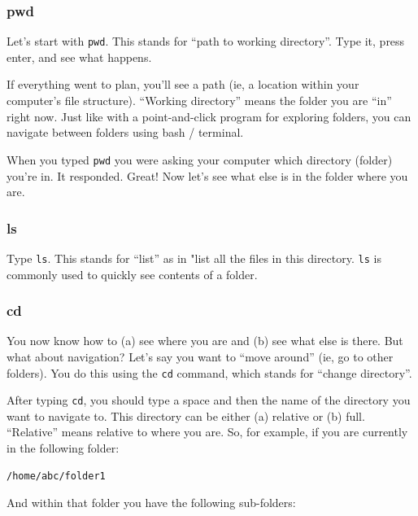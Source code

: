 \documentclass[
]{book}
\begin{document}
\hypertarget{pwd}{%
\subsubsection*{pwd}\label{pwd}}

Let's start with \texttt{pwd}. This stands for ``path to working directory''. Type it, press enter, and see what happens.

If everything went to plan, you'll see a path (ie, a location within your computer's file structure). ``Working directory'' means the folder you are ``in'' right now. Just like with a point-and-click program for exploring folders, you can navigate between folders using bash / terminal.

When you typed \texttt{pwd} you were asking your computer which directory (folder) you're in. It responded. Great! Now let's see what else is in the folder where you are.

\hypertarget{ls}{%
\subsubsection*{ls}\label{ls}}

Type \texttt{ls}. This stands for ``list'' as in "list all the files in this directory. \texttt{ls} is commonly used to quickly see contents of a folder.

\hypertarget{cd}{%
\subsubsection*{cd}\label{cd}}

You now know how to (a) see where you are and (b) see what else is there. But what about navigation? Let's say you want to ``move around'' (ie, go to other folders). You do this using the \texttt{cd} command, which stands for ``change directory''.

After typing \texttt{cd}, you should type a space and then the name of the directory you want to navigate to. This directory can be either (a) relative or (b) full. ``Relative'' means relative to where you are. So, for example, if you are currently in the following folder:

\begin{verbatim}
/home/abc/folder1
\end{verbatim}

And within that folder you have the following sub-folders:
\end{document}
